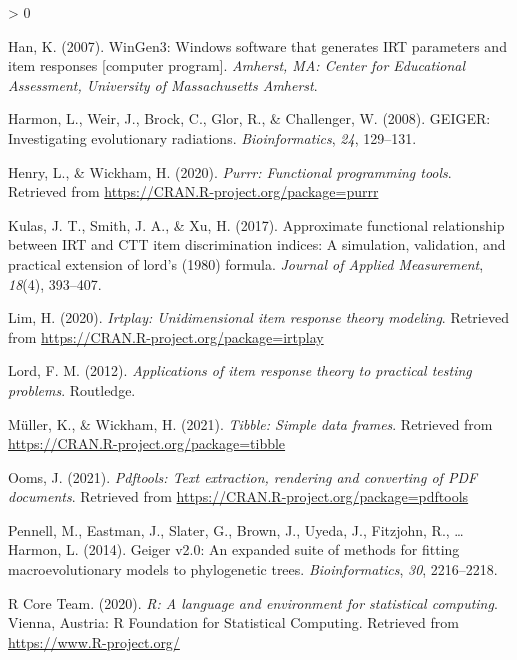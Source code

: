 \documentclass[
  english,
  man]{apa6}
\newlength{\cslhangindent}
\newenvironment{CSLReferences}[2] %
 {%
  \setlength{\parindent}{0pt}
  \ifodd #1 \everypar{\setlength{\hangindent}{\cslhangindent}}\ignorespaces\fi
  \ifnum #2 > 0
  \setlength{\parskip}{#2\baselineskip}
  \fi
 }%
 {}
\begin{document}
\begin{CSLReferences}{1}{0}
\leavevmode\hypertarget{ref-han2007wingen3}{}%
Han, K. (2007). WinGen3: Windows software that generates IRT parameters and item responses {[}computer program{]}. \emph{Amherst, MA: Center for Educational Assessment, University of Massachusetts Amherst}.

\leavevmode\hypertarget{ref-R-geiger_d}{}%
Harmon, L., Weir, J., Brock, C., Glor, R., \& Challenger, W. (2008). GEIGER: Investigating evolutionary radiations. \emph{Bioinformatics}, \emph{24}, 129--131.

\leavevmode\hypertarget{ref-R-purrr}{}%
Henry, L., \& Wickham, H. (2020). \emph{Purrr: Functional programming tools}. Retrieved from \url{https://CRAN.R-project.org/package=purrr}

\leavevmode\hypertarget{ref-kulas2017approximate}{}%
Kulas, J. T., Smith, J. A., \& Xu, H. (2017). Approximate functional relationship between IRT and CTT item discrimination indices: A simulation, validation, and practical extension of lord's (1980) formula. \emph{Journal of Applied Measurement}, \emph{18}(4), 393--407.

\leavevmode\hypertarget{ref-R-irtplay}{}%
Lim, H. (2020). \emph{Irtplay: Unidimensional item response theory modeling}. Retrieved from \url{https://CRAN.R-project.org/package=irtplay}

\leavevmode\hypertarget{ref-lord2012applications}{}%
Lord, F. M. (2012). \emph{Applications of item response theory to practical testing problems}. Routledge.

\leavevmode\hypertarget{ref-R-tibble}{}%
Müller, K., \& Wickham, H. (2021). \emph{Tibble: Simple data frames}. Retrieved from \url{https://CRAN.R-project.org/package=tibble}

\leavevmode\hypertarget{ref-R-pdftools}{}%
Ooms, J. (2021). \emph{Pdftools: Text extraction, rendering and converting of PDF documents}. Retrieved from \url{https://CRAN.R-project.org/package=pdftools}

\leavevmode\hypertarget{ref-R-geiger_e}{}%
Pennell, M., Eastman, J., Slater, G., Brown, J., Uyeda, J., Fitzjohn, R., \ldots{} Harmon, L. (2014). Geiger v2.0: An expanded suite of methods for fitting macroevolutionary models to phylogenetic trees. \emph{Bioinformatics}, \emph{30}, 2216--2218.

\leavevmode\hypertarget{ref-R-base}{}%
R Core Team. (2020). \emph{R: A language and environment for statistical computing}. Vienna, Austria: R Foundation for Statistical Computing. Retrieved from \url{https://www.R-project.org/}


\end{CSLReferences}
\end{document}
